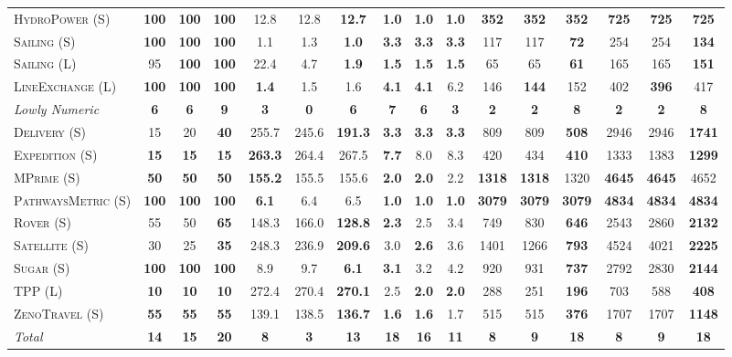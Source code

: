 \documentclass[11pt,landscape]{article}
\begin{document}
\begin{table*}[tb]
{\begin{tabular}{|l||ccc||ccc||ccc||ccc||ccc||}
\textsc{HydroPower} (S)&\textbf{100}&\textbf{100}&\textbf{100}&12.8&12.8&\textbf{12.7}&\textbf{1.0}&\textbf{1.0}&\textbf{1.0}&\textbf{352}&\textbf{352}&\textbf{352}&\textbf{725}&\textbf{725}&\textbf{725}\\
\textsc{Sailing} (S)&\textbf{100}&\textbf{100}&\textbf{100}&1.1&1.3&\textbf{1.0}&\textbf{3.3}&\textbf{3.3}&\textbf{3.3}&117&117&\textbf{72}&254&254&\textbf{134}\\
\textsc{Sailing} (L)&95&\textbf{100}&\textbf{100}&22.4&4.7&\textbf{1.9}&\textbf{1.5}&\textbf{1.5}&\textbf{1.5}&65&65&\textbf{61}&165&165&\textbf{151}\\
\textsc{LineExchange} (L)&\textbf{100}&\textbf{100}&\textbf{100}&\textbf{1.4}&1.5&1.6&\textbf{4.1}&\textbf{4.1}&6.2&146&\textbf{144}&152&402&\textbf{396}&417
\\\hline
\textit{Lowly Numeric}&\textbf{6}&\textbf{6}&\textbf{9}&\textbf{3}&\textbf{0}&\textbf{6}&\textbf{7}&\textbf{6}&\textbf{3}&\textbf{2}&\textbf{2}&\textbf{8}&\textbf{2}&\textbf{2}&\textbf{8}\\\hline
\textsc{Delivery} (S)&15&20&\textbf{40}&255.7&245.6&\textbf{191.3}&\textbf{3.3}&\textbf{3.3}&\textbf{3.3}&809&809&\textbf{508}&2946&2946&\textbf{1741}\\
\textsc{Expedition} (S)&\textbf{15}&\textbf{15}&\textbf{15}&\textbf{263.3}&264.4&267.5&\textbf{7.7}&8.0&8.3&420&434&\textbf{410}&1333&1383&\textbf{1299}\\
\textsc{MPrime} (S)&\textbf{50}&\textbf{50}&\textbf{50}&\textbf{155.2}&155.5&155.6&\textbf{2.0}&\textbf{2.0}&2.2&\textbf{1318}&\textbf{1318}&1320&\textbf{4645}&\textbf{4645}&4652\\
\textsc{PathwaysMetric} (S)&\textbf{100}&\textbf{100}&\textbf{100}&\textbf{6.1}&6.4&6.5&\textbf{1.0}&\textbf{1.0}&\textbf{1.0}&\textbf{3079}&\textbf{3079}&\textbf{3079}&\textbf{4834}&\textbf{4834}&\textbf{4834}\\
\textsc{Rover} (S)&55&50&\textbf{65}&148.3&166.0&\textbf{128.8}&\textbf{2.3}&2.5&3.4&749&830&\textbf{646}&2543&2860&\textbf{2132}\\
\textsc{Satellite} (S)&30&25&\textbf{35}&248.3&236.9&\textbf{209.6}&3.0&\textbf{2.6}&3.6&1401&1266&\textbf{793}&4524&4021&\textbf{2225}\\
\textsc{Sugar} (S)&\textbf{100}&\textbf{100}&\textbf{100}&8.9&9.7&\textbf{6.1}&\textbf{3.1}&3.2&4.2&920&931&\textbf{737}&2792&2830&\textbf{2144}\\
\textsc{TPP} (L)&\textbf{10}&\textbf{10}&\textbf{10}&272.4&270.4&\textbf{270.1}&2.5&\textbf{2.0}&\textbf{2.0}&288&251&\textbf{196}&703&588&\textbf{408}\\
\textsc{ZenoTravel} (S)&\textbf{55}&\textbf{55}&\textbf{55}&139.1&138.5&\textbf{136.7}&\textbf{1.6}&\textbf{1.6}&1.7&515&515&\textbf{376}&1707&1707&\textbf{1148}
\\\hline
\textit{Total}&\textbf{14}&\textbf{15}&\textbf{20}&\textbf{8}&\textbf{3}&\textbf{13}&\textbf{18}&\textbf{16}&\textbf{11}&\textbf{8}&\textbf{9}&\textbf{18}&\textbf{8}&\textbf{9}&\textbf{18}\\\hline


\end{tabular}}
\end{table*}
\end{document}
